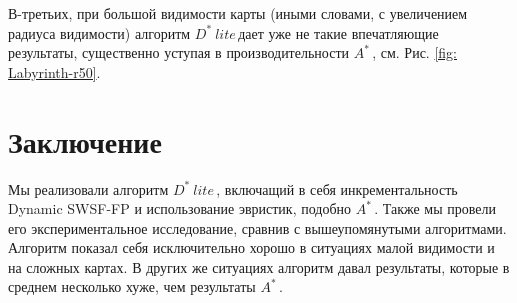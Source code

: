 \documentclass[11pt]{article}
\newcommand{\dstarlite}{\(D^*\ lite\)\,}
\newcommand{\astar}{\(A^*\)\,}
\begin{document}
    В-третьих, при большой видимости карты (иными словами, с увеличением радиуса видимости) алгоритм \dstarlite дает уже не такие впечатляющие результаты, существенно уступая в производительности \astar, см. Рис. \ref{fig: Labyrinth-r50}.


    \section{Заключение}
    Мы реализовали алгоритм \dstarlite, включащий в себя инкрементальность Dynamic SWSF-FP и использование эвристик, подобно \astar.
    Также мы провели его экспериментальное исследование, сравнив с вышеупомянутыми алгоритмами.
    Алгоритм показал себя исключительно хорошо в ситуациях малой видимости и на сложных картах.
    В других же ситуациях алгоритм давал результаты, которые в среднем несколько хуже, чем результаты \astar.

    \newpage
    
    
\end{document}
